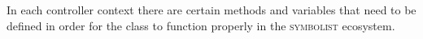 \documentclass{article}
\def\symbolist{\textsc{symbolist}\xspace}
\def\drawsocket{\textsc{drawsocket}\xspace}
\def\uicontroller{\textit{ui\_controller}\xspace}
\def\iocontroller{\textit{io\_controller}\xspace}
\begin{document}
In each controller context there are certain methods and variables that need to be defined in order for the class to function properly in the \symbolist ecosystem.


%
%
%
%
%
%
%
\end{document}
